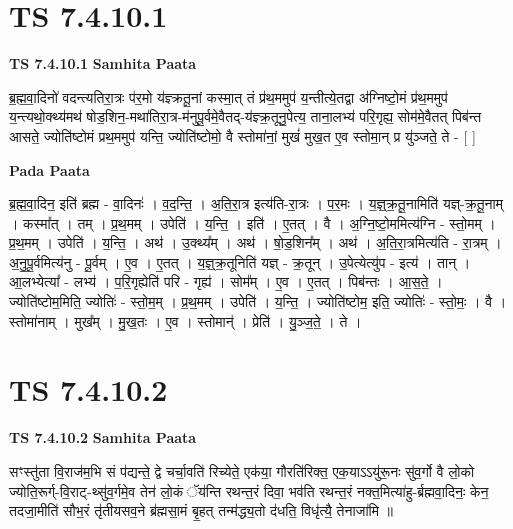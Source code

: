 \documentclass[17pt]{extarticle}
\begin{document}

\section{ TS 7.4.10.1 }

\textbf{TS 7.4.10.1 } \newline
\textbf{Samhita Paata} \newline

ब्र॒ह्म॒वा॒दिनो॑ वदन्त्यतिरा॒त्रः प॑र॒मो य॑ज्ञ्क्रतू॒नां कस्मा॒त् तं प्र॑थ॒ममुप॑ य॒न्तीत्ये॒तद्वा अ॑ग्निष्टो॒मं प्र॑थ॒ममुप॑ य॒न्त्यथो॒क्थ्य॑मथ॑ षोड॒शिन॒-मथा॑तिरा॒त्र-म॑नुपू॒र्वमे॒वैतद्-य॑ज्ञ्क्र॒तूनु॒पेत्य॒ ताना॒लभ्य॑ परि॒गृह्य॒ सोम॑मे॒वैतत् पिब॑न्त आसते॒ ज्योति॑ष्टोमं प्रथ॒ममुप॑ यन्ति॒ ज्योति॑ष्टोमो॒ वै स्तोमा॑नां॒ मुखं॑ मुख॒त ए॒व स्तोमा॒न् प्र यु॑ञ्जते॒ ते - [  ] \newline

\textbf{Pada Paata} \newline

ब्र॒ह्म॒वा॒दिन॒ इति॑ ब्रह्म - वा॒दिनः॑ । व॒द॒न्ति॒ । अ॒ति॒रा॒त्र इत्य॑ति-रा॒त्रः । प॒र॒मः । य॒ज्ञ्॒क्र॒तू॒नामिति॑ यज्ञ्-क्र॒तू॒नाम् । कस्मा᳚त् । तम् । प्र॒थ॒मम् । उपेति॑ । य॒न्ति॒ । इति॑ । ए॒तत् । वै । अ॒ग्नि॒ष्टो॒ममित्य॑ग्नि - स्तो॒मम् । प्र॒थ॒मम् । उपेति॑ । य॒न्ति॒ । अथ॑ । उ॒क्थ्य᳚म् । अथ॑ । षो॒ड॒शिन᳚म् । अथ॑ । अ॒ति॒रा॒त्रमित्य॑ति - रा॒त्रम् । अ॒नु॒पू॒र्वमित्य॑नु - पू॒र्वम् । ए॒व । ए॒तत् । य॒ज्ञ्॒क्र॒तूनिति॑ यज्ञ् - क्र॒तून् । उ॒पेत्येत्यु॑प - इत्य॑ । तान् । आ॒लभ्येत्या᳚ - लभ्य॑ । प॒रि॒गृह्येति॑ परि - गृह्य॑ । सोम᳚म् । ए॒व । ए॒तत् । पिब॑न्तः । आ॒स॒ते॒ । ज्योति॑ष्टोम॒मिति॒ ज्योतिः॑ - स्तो॒म॒म् । प्र॒थ॒मम् । उपेति॑ । य॒न्ति॒ । ज्योति॑ष्टोम॒ इति॒ ज्योतिः॑ - स्तो॒मः॒ । वै । स्तोमा॑नाम् । मुख᳚म् । मु॒ख॒तः । ए॒व । स्तोमान्॑ । प्रेति॑ । यु॒ञ्ज॒ते॒ । ते ।  \newline





\section{ TS 7.4.10.2 }

\textbf{TS 7.4.10.2 } \newline
\textbf{Samhita Paata} \newline

सꣳस्तु॑ता वि॒राज॑म॒भि सं प॑द्यन्ते॒ द्वे चर्चा॒वति॑ रिच्येते॒ एक॑या॒ गौरति॑रिक्त॒ एक॒याऽऽयु॑रू॒नः सु॑व॒र्गो वै लो॒को ज्योति॒रूर्ग्-वि॒राट्-थ्सु॑व॒र्गमे॒व तेन॑ लो॒कं ॅय॑न्ति रथन्त॒रं दिवा॒ भव॑ति रथन्त॒रं नक्त॒मित्या॑हु-र्ब्रह्मवा॒दिनः॒ केन॒ तदजा॒मीति॑ सौभ॒रं तृ॑तीयसव॒ने ब्र॑ह्मसा॒मं बृ॒हत् तन्म॑द्ध्य॒तो द॑धति॒ विधृ॑त्यै॒ तेनाजा॑मि ॥ \newline
\end{document}
